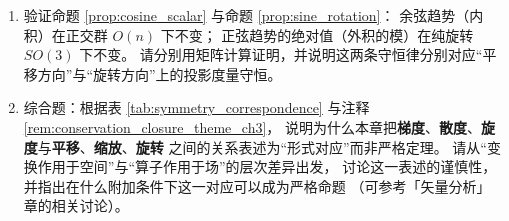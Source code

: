 \begin{enumerate}[leftmargin=3em, label=\textbf{题 \arabic*}]
    \item 验证命题 \ref{prop:cosine_scalar} 与命题 \ref{prop:sine_rotation}：
    余弦趋势（内积）在正交群 $O(n)$ 下不变；
    正弦趋势的绝对值（外积的模）在纯旋转 $SO(3)$ 下不变。
    请分别用矩阵计算证明，并说明这两条守恒律分别对应“平移方向”与“旋转方向”上的投影度量守恒。

    \item 综合题：根据表 \ref{tab:symmetry_correspondence} 与注释 \ref{rem:conservation_closure_theme_ch3}，
    说明为什么本章把\textbf{梯度}、\textbf{散度}、\textbf{旋度}与\textbf{平移}、\textbf{缩放}、\textbf{旋转}
    之间的关系表述为“形式对应”而非严格定理。
    请从“变换作用于空间”与“算子作用于场”的层次差异出发，
    讨论这一表述的谨慎性，并指出在什么附加条件下这一对应可以成为严格命题
    （可参考「矢量分析」章的相关讨论）。
\end{enumerate}

